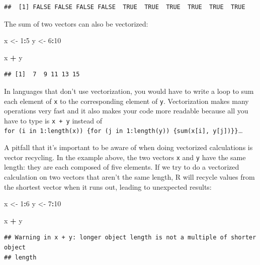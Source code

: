 \documentclass[
]{book}
\newenvironment{Shaded}{\begin{snugshade}}{\end{snugshade}}
\newcommand{\DecValTok}[1]{\textcolor[rgb]{0.00,0.00,0.81}{#1}}
\newcommand{\NormalTok}[1]{#1}
\newcommand{\OtherTok}[1]{\textcolor[rgb]{0.56,0.35,0.01}{#1}}
\newcommand{\SpecialCharTok}[1]{\textcolor[rgb]{0.81,0.36,0.00}{\textbf{#1}}}
\begin{document}
\begin{verbatim}
##  [1] FALSE FALSE FALSE FALSE  TRUE  TRUE  TRUE  TRUE  TRUE  TRUE
\end{verbatim}

The sum of two vectors can also be vectorized:

\begin{Shaded}
\begin{Highlighting}[]
\NormalTok{x }\OtherTok{\textless{}{-}} \DecValTok{1}\SpecialCharTok{:}\DecValTok{5}
\NormalTok{y }\OtherTok{\textless{}{-}} \DecValTok{6}\SpecialCharTok{:}\DecValTok{10}

\NormalTok{x }\SpecialCharTok{+}\NormalTok{ y}
\end{Highlighting}
\end{Shaded}

\begin{verbatim}
## [1]  7  9 11 13 15
\end{verbatim}

In languages that don't use vectorization, you would have to write a loop to
sum each element of \texttt{x} to the corresponding element of \texttt{y}. Vectorization makes
many operations very fast and it also makes your code more readable because all
you have to type is \texttt{x\ +\ y} instead of \texttt{for\ (i\ in\ 1:length(x))\ \{for\ (j\ in\ 1:length(y))\ \{sum(x{[}i{]},\ y{[}j{]})\}\}}\ldots{}

A pitfall that it's important to be aware of when doing vectorized calculations
is vector recycling. In the example above, the two vectors \texttt{x} and \texttt{y} have the
same length: they are each composed of five elements. If we try to do a
vectorized calculation on two vectors that aren't the same length, R will
recycle values from the shortest vector when it runs out, leading to unexpected
results:

\begin{Shaded}
\begin{Highlighting}[]
\NormalTok{x }\OtherTok{\textless{}{-}} \DecValTok{1}\SpecialCharTok{:}\DecValTok{6}
\NormalTok{y }\OtherTok{\textless{}{-}} \DecValTok{7}\SpecialCharTok{:}\DecValTok{10}

\NormalTok{x }\SpecialCharTok{+}\NormalTok{ y}
\end{Highlighting}
\end{Shaded}

\begin{verbatim}
## Warning in x + y: longer object length is not a multiple of shorter object
## length
\end{verbatim}
\end{document}
